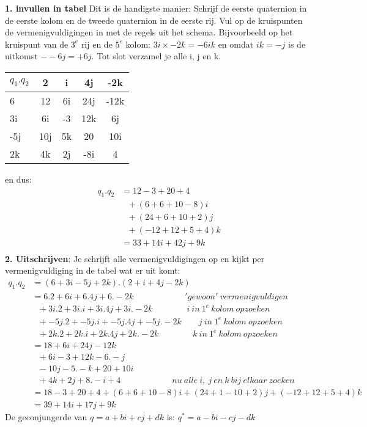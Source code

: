 \documentclass[hidelinks, a4wide, 12pt,  twoside]{book}
\begin{document}
\textbf{1. invullen in tabel} Dit is de handigste manier:  Schrijf de eerste quaternion in de eerste kolom en de tweede quaternion in de eerste rij. Vul op de kruispunten de 
vermenigvuldigingen in met de  regels uit het schema. Bijvoorbeeld op het kruispunt van de $ 3^e $ rij en de $   5^e $ kolom: $  3i\times -2k = -6ik   $ en omdat $ ik = -j $ is de uitkomst $ --6j = +6j $. Tot slot verzamel je  alle i, j en k.
\begin{center}
	\begin{tabular}{ | l || c | c |c |c |}
		\hline
		$ q_1.q_2 $& 2 & i & 4j & -2k \\ \hline \hline
		6 & 12 & 6i & 24j & -12k  \\ \hline
		3i & 6i & -3 & 12k & 6j\\ \hline
		-5j & 10j &  5k & 20 & 10i\\ \hline
		2k & 4k & 2j & -8i & 4\\ 
		\hline 
	\end{tabular}
\end{center}
en dus:
\begin{align*}
q_1.q_2 & = 12 - 3 + 20 + 4 \\
& \ \ \ +(6 + 6 + 10 - 8)i \\
& \ \ \ +(24 + 6 +10 +2)j \\
& \ \ \ +(-12 + 12 + 5 +4 )k \\
& = 33 +14i +42j +9k \\
\end{align*}
\textbf{2. Uitschrijven}: Je schrijft alle vermenigvuldigingen op en kijkt per vermenigvuldiging in de tabel wat er uit komt:
\begin{align*}
q_1.q_2 & = (6 + 3i - 5j + 2k) . (2 + i + 4j - 2k) \\
& =   6.2 + 6i + 6.4j + 6.-2k \qquad  \qquad \qquad  'gewoon' \  vermenigvuldigen\\
& \ \ \ + 3i.2 + 3i.i + 3i.4j + 3i.-2k \qquad \qquad  i\  in \ 1^e \  kolom  \ opzoeken\\
& \ \ \ + -5j.2 + -5j.i + -5j.4j + -5j.-2k \qquad j \  in \ 1^e \ kolom \ opzoeken\\
& \ \ \ + 2k.2 + 2k.i + 2k.4j + 2k.-2k \qquad \qquad k \  in \ 1^e \ kolom \ opzoeken\\
& = 18 + 6i + 24j - 12k \\
& \ \ \ + 6i - 3 + 12k -6.-j \\
& \ \ \ -10j - 5.-k + 20 +10i \\
& \ \ \  + 4k + 2j + 8.-i + 4 \qquad \qquad \qquad   nu \ alle \ i, \ j \ en \ k\ bij \ elkaar \  zoeken \\
& = 18 - 3 + 20 + 4 + (6+6 + 10 -8)i + (24 + 1 - 10 + 2)j + (-12 + 12 + 5 + 4)k \\
&  = 39 + 14i +17j +9k
\end{align*}
{De geconjungerde van $ q = a +bi + cj + dk $  is: 
	\quad	$ q^* = a - bi - cj - dk $ }\\ \\
\end{document}
